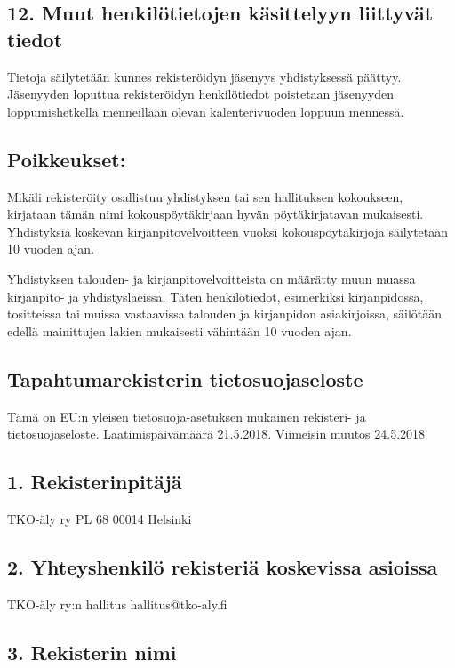 \documentclass[finnish]{tktltiki}
\begin{document}
\subsection*{12. Muut henkilötietojen käsittelyyn liittyvät tiedot}

Tietoja säilytetään kunnes rekisteröidyn jäsenyys yhdistyksessä päättyy. Jäsenyyden loputtua rekisteröidyn henkilötiedot poistetaan jäsenyyden loppumishetkellä menneillään olevan kalenterivuoden loppuun mennessä.

\subsection*{Poikkeukset:}

Mikäli rekisteröity osallistuu yhdistyksen tai sen hallituksen kokoukseen, kirjataan tämän nimi kokouspöytäkirjaan hyvän pöytäkirjatavan mukaisesti. Yhdistyksiä koskevan kirjanpitovelvoitteen vuoksi kokouspöytäkirjoja säilytetään 10 vuoden ajan.

Yhdistyksen talouden- ja kirjanpitovelvoitteista on määrätty muun muassa kirjanpito- ja yhdistyslaeissa. Täten henkilötiedot, esimerkiksi kirjanpidossa, tositteissa tai muissa vastaavissa talouden ja kirjanpidon asiakirjoissa, säilötään edellä mainittujen lakien mukaisesti vähintään 10 vuoden ajan.



\pagestyle{empty}


\subsection*{Tapahtumarekisterin tietosuojaseloste}
Tämä on EU:n yleisen tietosuoja-asetuksen mukainen rekisteri- ja tietosuojaseloste.
Laatimispäivämäärä 21.5.2018. Viimeisin muutos 24.5.2018

\subsection*{1. Rekisterinpitäjä}
TKO-äly ry
PL 68
00014 Helsinki
\subsection*{2. Yhteyshenkilö rekisteriä koskevissa asioissa}

TKO-äly ry:n hallitus
hallitus@tko-aly.fi

\subsection*{3. Rekisterin nimi}
\end{document}
